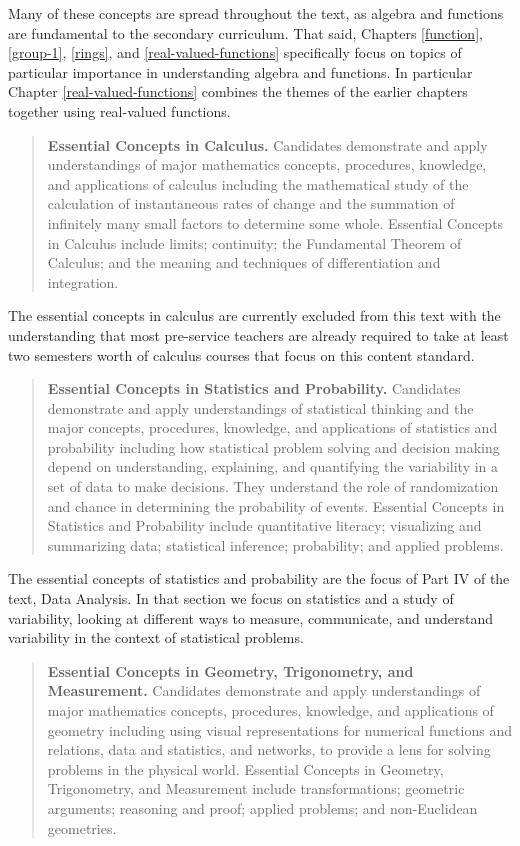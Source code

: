 \documentclass[
]{book}
\theoremstyle{definition}
\theoremstyle{definition}
\theoremstyle{definition}
\theoremstyle{definition}
\theoremstyle{remark}
\begin{document}
Many of these concepts are spread throughout the text, as algebra and functions are fundamental to the secondary curriculum. That said, Chapters \ref{function}, \ref{group-1}, \ref{rings}, and \ref{real-valued-functions} specifically focus on topics of particular importance in understanding algebra and functions. In particular Chapter \ref{real-valued-functions} combines the themes of the earlier chapters together using real-valued functions.

\begin{quote}
\textbf{Essential Concepts in Calculus.} Candidates demonstrate and apply understandings of major mathematics concepts, procedures, knowledge, and applications of calculus including the mathematical study of the calculation of instantaneous rates of change and the summation of infinitely many small factors to determine some whole. Essential Concepts in Calculus include limits; continuity; the Fundamental Theorem of Calculus; and the meaning and techniques of differentiation and integration.
\end{quote}

The essential concepts in calculus are currently excluded from this text with the understanding that most pre-service teachers are already required to take at least two semesters worth of calculus courses that focus on this content standard.

\begin{quote}
\textbf{Essential Concepts in Statistics and Probability.} Candidates demonstrate and apply understandings of statistical thinking and the major concepts, procedures, knowledge, and applications of statistics and probability including how statistical problem solving and decision making depend on understanding, explaining, and quantifying the variability in a set of data to make decisions. They understand the role of randomization and chance in determining the probability of events. Essential Concepts in Statistics and Probability include quantitative literacy; visualizing and summarizing data; statistical inference; probability; and applied problems.
\end{quote}

The essential concepts of statistics and probability are the focus of Part IV of the text, Data Analysis. In that section we focus on statistics and a study of variability, looking at different ways to measure, communicate, and understand variability in the context of statistical problems.

\begin{quote}
\textbf{Essential Concepts in Geometry, Trigonometry, and Measurement.} Candidates demonstrate and apply understandings of major mathematics concepts, procedures, knowledge, and applications of geometry including using visual representations for numerical functions and relations, data and statistics, and networks, to provide a lens for solving problems in the physical world. Essential Concepts in Geometry, Trigonometry, and Measurement include transformations; geometric arguments; reasoning and proof; applied problems; and non-Euclidean geometries.
\end{quote}
\end{document}
